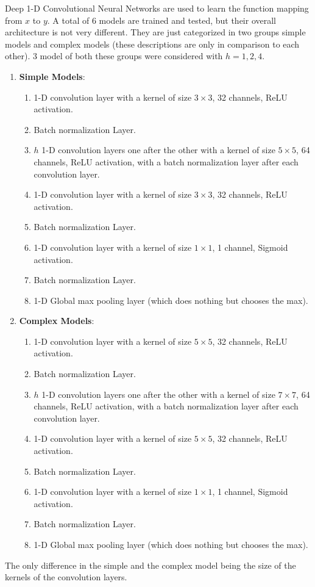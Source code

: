 \documentclass[twoside]{article}
\begin{document}
	Deep 1-D Convolutional Neural Networks are used to learn the function mapping from $x$ to $y$. A total of 6 models are trained and tested, but their overall architecture is not very different. They are just categorized in two groups simple models and complex models (these descriptions are only in comparison to each other). 3 model of both these groups were considered with $h = 1, 2, 4$.
	\begin{enumerate}
		\item \textbf{Simple Models}:
		\begin{enumerate}
			\item  1-D convolution layer with a kernel of size $3 \times 3$, 32 channels, ReLU activation.
			\item Batch normalization Layer.
			\item $h$ 1-D convolution layers one after the other with a kernel of size $5 \times 5$, 64 channels, ReLU activation, with a batch normalization layer after each convolution layer.
			\item  1-D convolution layer with a kernel of size $3 \times 3$, 32 channels, ReLU activation.
			\item Batch normalization Layer.
			\item  1-D convolution layer with a kernel of size $1 \times 1$, 1 channel, Sigmoid activation.
			\item Batch normalization Layer.
			\item 1-D Global max pooling layer (which does nothing but chooses the max).
		\end{enumerate}
		\item \textbf{Complex Models}:
		\begin{enumerate}
			\item  1-D convolution layer with a kernel of size $5 \times 5$, 32 channels, ReLU activation.
			\item Batch normalization Layer.
			\item $h$ 1-D convolution layers one after the other with a kernel of size $7 \times 7$, 64 channels, ReLU activation, with a batch normalization layer after each convolution layer.
			\item  1-D convolution layer with a kernel of size $5 \times 5$, 32 channels, ReLU activation.
			\item Batch normalization Layer.
			\item  1-D convolution layer with a kernel of size $1 \times 1$, 1 channel, Sigmoid activation.
			\item Batch normalization Layer.
			\item 1-D Global max pooling layer (which does nothing but chooses the max).
		\end{enumerate}
	\end{enumerate}
	The only difference in the simple and the complex model being the size of the kernels of the convolution layers.
	
\end{document}
